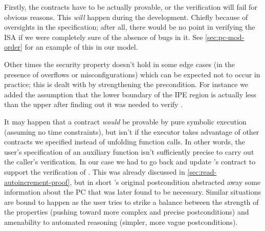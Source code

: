 Firstly, the contracts have to be actually provable, or the verification will fail for obvious reasons. This \emph{will} happen during the development. Chiefly because of oversights in the specification; after all, there would be no point in verifying the ISA if we were completely sure of the absence of bugs in it. See \cref{sec:pc-mod-order} for an example of this in our \msp model.

Other times the security property doesn't hold in some edge cases (\eg in the presence of overflows or misconfigurations) which can be expected not to occur in practice; this is dealt with by strengthening the precondition. For instance we added the assumption that the lower boundary of the IPE region is actually less than the upper after finding out it was needed to verify .

It may happen that a contract \emph{would} be provable by pure symbolic execution (assuming no time constraints), but isn't if the executor takes advantage of other contracts we specified instead of unfolding function calls. In other words, the user's specification of an auxiliary function isn't sufficiently precise to carry out the caller's verification. In our case we had to go back and update 's contract to support the verification of . This was already discussed in \cref{sec:read-autoincrement-proof}, but in short 's original postcondition abstracted away some information about the PC that was later found to be necessary. Similar situations are bound to happen as the user tries to strike a balance between the strength of the properties (pushing \eg toward more complex and precise postconditions) and amenability to automated reasoning (simpler, more vague postconditions).

